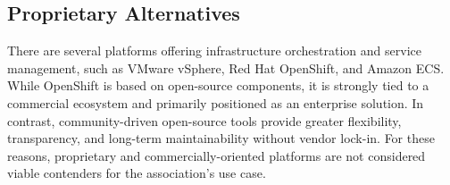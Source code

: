\subsection*{Proprietary Alternatives}

There are several platforms offering infrastructure orchestration and service management, such as VMware vSphere, Red Hat OpenShift, and Amazon ECS. While OpenShift is based on open-source components, it is strongly tied to a commercial ecosystem and primarily positioned as an enterprise solution. In contrast, community-driven open-source tools provide greater flexibility, transparency, and long-term maintainability without vendor lock-in. For these reasons, proprietary and commercially-oriented platforms are not considered viable contenders for the association's use case.